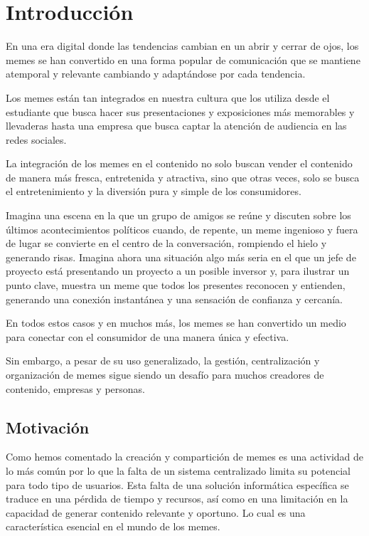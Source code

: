 \chapter{Introducción}

En una era digital donde las tendencias cambian en un abrir y cerrar de ojos, los memes se han convertido en una forma popular de comunicación que se mantiene atemporal y relevante cambiando y adaptándose por cada tendencia.

Los memes están tan integrados en nuestra cultura que los utiliza desde el estudiante que busca hacer sus presentaciones y exposiciones más memorables y llevaderas hasta una empresa que busca captar la atención de audiencia en las redes sociales.

La integración de los memes en el contenido no solo buscan vender el contenido de manera más fresca, entretenida y atractiva, sino que otras veces, solo se busca el entretenimiento y la diversión pura y simple de los consumidores.

Imagina una escena en la que un grupo de amigos se reúne y discuten sobre los últimos acontecimientos políticos cuando, de repente, un meme ingenioso y fuera de lugar se convierte en el centro de la conversación, rompiendo el hielo y generando risas. Imagina ahora una situación algo más seria en el que un jefe de proyecto está presentando un proyecto a un posible inversor y, para ilustrar un punto clave, muestra un meme que todos los presentes reconocen y entienden, generando una conexión instantánea y una sensación de confianza y cercanía.

En todos estos casos y en muchos más, los memes se han convertido un medio para conectar con el consumidor de una manera única y efectiva.

Sin embargo, a pesar de su uso generalizado, la gestión, centralización y organización de memes sigue siendo un desafío para muchos creadores de contenido, empresas y personas.

\section{Motivación}

Como hemos comentado la creación y compartición de memes es una actividad de lo más común por lo que la falta de un sistema centralizado limita su potencial para todo tipo de usuarios. Esta falta de una solución informática específica se traduce en una pérdida de tiempo y recursos, así como en una limitación en la capacidad de generar contenido relevante y oportuno. Lo cual es una característica esencial en el mundo de los memes.

